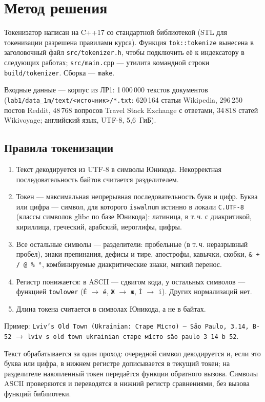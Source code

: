 \pagebreak
\section{Метод решения}
Токенизатор написан на C++17 со стандартной библиотекой (STL для токенизации разрешена правилами курса). Функция \texttt{tok::tokenize} вынесена в заголовочный файл \texttt{src/tokenizer.h}, чтобы подключить её к индексатору в следующих работах; \texttt{src/main.cpp} --- утилита командной строки \texttt{build/tokenizer}. Сборка --- \texttt{make}.

Входные данные --- корпус из ЛР1: 1\,000\,000 текстов документов (\texttt{lab1/data\_1m/text/<источник>/*.txt}: 620\,164 статьи Wikipedia, 296\,250 постов Reddit, 48\,768 вопросов Travel Stack Exchange с ответами, 34\,818 статей Wikivoyage; английский язык, UTF-8, 5,6~ГиБ).

\subsection{Правила токенизации}
\begin{enumerate}
    \item Текст декодируется из UTF-8 в символы Юникода. Некорректная последовательность байтов считается разделителем.
    \item Токен --- максимальная непрерывная последовательность букв и цифр. Буква или цифра --- символ, для которого \texttt{iswalnum} истинно в локали \texttt{C.UTF-8} (классы символов glibc по базе Юникода): латиница, в т.\,ч. с диакритикой, кириллица, греческий, арабский, иероглифы, цифры.
    \item Все остальные символы --- разделители: пробельные (в т.\,ч. неразрывный пробел), знаки препинания, дефисы и тире, апострофы, кавычки, скобки, \texttt{\& + / @ \% °}, комбинируемые диакритические знаки, мягкий перенос.
    \item Регистр понижается: в ASCII --- сдвигом кода, у остальных символов --- функцией \texttt{towlower} (\texttt{É} $\to$ \texttt{é}, \texttt{Ж} $\to$ \texttt{ж}, \texttt{İ} $\to$ \texttt{i}). Других нормализаций нет.
    \item Длина токена считается в символах Юникода, а не в байтах.
\end{enumerate}
Пример: \texttt{Lviv's Old Town (Ukrainian: Старе Місто) --- São Paulo, 3.14, B-52} $\to$ \texttt{lviv s old town ukrainian старе місто são paulo 3 14 b 52}.

Текст обрабатывается за один проход: очередной символ декодируется и, если это буква или цифра, в нижнем регистре дописывается в текущий токен; на разделителе накопленный токен передаётся функции обратного вызова. Символы ASCII проверяются и переводятся в нижний регистр сравнениями, без вызова функций библиотеки.

